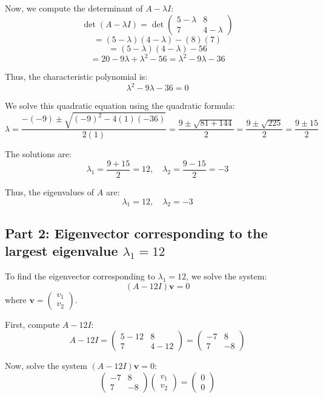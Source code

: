 \documentclass[11pt]{article}
\begin{document}
Now, we compute the determinant of \( A - \lambda I \):
\[
\det(A - \lambda I) = \det\begin{pmatrix} 5 - \lambda & 8 \\ 7 & 4 - \lambda \end{pmatrix}
\]
\[
= (5 - \lambda)(4 - \lambda) - (8)(7)
\]
\[
= (5 - \lambda)(4 - \lambda) - 56
\]
\[
= 20 - 9\lambda + \lambda^2 - 56 = \lambda^2 - 9\lambda - 36
\]

Thus, the characteristic polynomial is:
\[
\lambda^2 - 9\lambda - 36 = 0
\]

We solve this quadratic equation using the quadratic formula:
\[
\lambda = \frac{-(-9) \pm \sqrt{(-9)^2 - 4(1)(-36)}}{2(1)} = \frac{9 \pm \sqrt{81 + 144}}{2} = \frac{9 \pm \sqrt{225}}{2} = \frac{9 \pm 15}{2}
\]

The solutions are:
\[
\lambda_1 = \frac{9 + 15}{2} = 12, \quad \lambda_2 = \frac{9 - 15}{2} = -3
\]

Thus, the eigenvalues of \( A \) are:
\[
\lambda_1 = 12, \quad \lambda_2 = -3
\]

\newpage

\subsection{Part 2: Eigenvector corresponding to the largest eigenvalue \( \lambda_1 = 12 \)}

To find the eigenvector corresponding to \( \lambda_1 = 12 \), we solve the system:
\[
(A - 12I) \mathbf{v} = 0
\]
where \( \mathbf{v} = \begin{pmatrix} v_1 \\ v_2 \end{pmatrix} \).

First, compute \( A - 12I \):
\[
A - 12I = \begin{pmatrix} 5 - 12 & 8 \\ 7 & 4 - 12 \end{pmatrix} = \begin{pmatrix} -7 & 8 \\ 7 & -8 \end{pmatrix}
\]

Now, solve the system \( (A - 12I) \mathbf{v} = 0 \):
\[
\begin{pmatrix} -7 & 8 \\ 7 & -8 \end{pmatrix} \begin{pmatrix} v_1 \\ v_2 \end{pmatrix} = \begin{pmatrix} 0 \\ 0 \end{pmatrix}
\]
\end{document}
